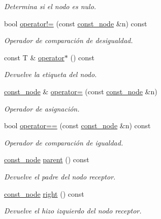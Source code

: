 \begin{DoxyCompactItemize}
\begin{DoxyCompactList}\small\item\em Determina si el nodo es nulo. \end{DoxyCompactList}\item 
bool \hyperlink{classbintree_1_1const__node_a75a32333580dd26be46d4f9d5e9818d8}{operator!=} (const \hyperlink{classbintree_1_1const__node}{const\+\_\+node} \&n) const 
\begin{DoxyCompactList}\small\item\em Operador de comparación de desigualdad. \end{DoxyCompactList}\item 
const T \& \hyperlink{classbintree_1_1const__node_a2aaf8e239d0d763e2fc0ecb3425c1b5a}{operator$\ast$} () const 
\begin{DoxyCompactList}\small\item\em Devuelve la etiqueta del nodo. \end{DoxyCompactList}\item 
\hyperlink{classbintree_1_1const__node}{const\+\_\+node} \& \hyperlink{classbintree_1_1const__node_a15de7a0172cadeafc839d4a6c2631edb}{operator=} (const \hyperlink{classbintree_1_1const__node}{const\+\_\+node} \&n)
\begin{DoxyCompactList}\small\item\em Operador de asignación. \end{DoxyCompactList}\item 
bool \hyperlink{classbintree_1_1const__node_aed0108be5dccd63aa8accb0eb42ef5b3}{operator==} (const \hyperlink{classbintree_1_1const__node}{const\+\_\+node} \&n) const 
\begin{DoxyCompactList}\small\item\em Operador de comparación de igualdad. \end{DoxyCompactList}\item 
\hyperlink{classbintree_1_1const__node}{const\+\_\+node} \hyperlink{classbintree_1_1const__node_ab7ea1bdf5af7b4ef38a0e1f18cd32c79}{parent} () const 
\begin{DoxyCompactList}\small\item\em Devuelve el padre del nodo receptor. \end{DoxyCompactList}\item 
\hyperlink{classbintree_1_1const__node}{const\+\_\+node} \hyperlink{classbintree_1_1const__node_a7e86d4987f8a8b9844fcc53a9205ae30}{right} () const 
\begin{DoxyCompactList}\small\item\em Devuelve el hizo izquierdo del nodo receptor. \end{DoxyCompactList}\end{DoxyCompactItemize}
